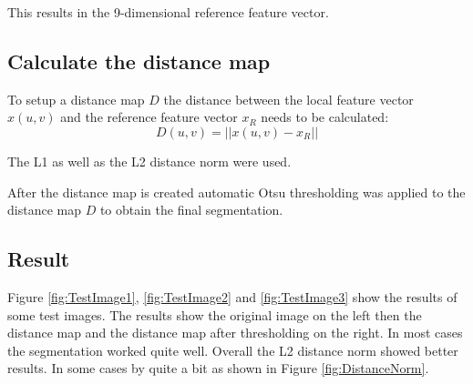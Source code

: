 This results in the 9-dimensional reference feature vector.

\subsection{Calculate the distance map}
To setup a distance map $D$ the distance between the local feature vector $x(u,v)$ and the reference feature vector $x_R$ needs to be calculated:
\begin{equation}
	D(u,v) = ||x(u,v) - x_R||
\end{equation}

The L1 as well as the L2 distance norm were used.

After the distance map is created automatic Otsu thresholding was applied to the distance map $D$ to obtain the final segmentation.

\subsection{Result}

Figure \ref{fig:TestImage1}, \ref{fig:TestImage2} and \ref{fig:TestImage3} show the results of some test images. The results show the original image on the left then the distance map and the distance map after thresholding on the right. In most cases the segmentation worked quite well.
Overall the L2 distance norm showed better results. In some cases by quite a bit as shown in Figure \ref{fig:DistanceNorm}.

